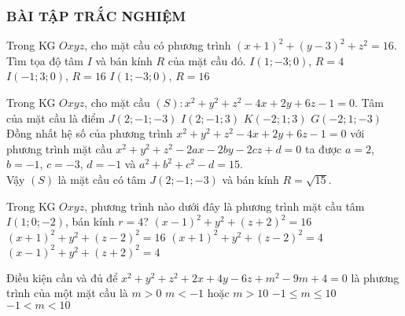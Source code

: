 \subsubsection{BÀI TẬP TRẮC NGHIỆM}
\begin{ex}%
	Trong KG $Oxyz$, cho mặt cầu có phương trình $(x+1)^2+(y-3)^2+z^2=16$. Tìm tọa độ tâm $I$ và bán kính $R$ của mặt cầu đó.
	{$I(1;-3;0)$, $R=4$}
	{$I(-1;3;0)$, $R=16$}
	{$I(1;-3;0)$, $R=16$}
\end{ex}
\begin{ex}%
	Trong KG $Oxyz$, cho mặt cầu $(S)\colon x^2+y^2+z^2 -4x+2y+6z-1=0$. Tâm của mặt cầu là điểm
	\choice
	{\True $J(2;-1;-3)$}
	{$I(2;-1;3)$}
	{$K(-2;1;3)$}
	{$G(-2;1;-3)$}
	\loigiai
	{
		Đồng nhất hệ số của phương trình $x^2+y^2+z^2 -4x+2y+6z-1=0$ với phương trình mặt cầu $x^2+y^2+z^2 -2ax-2by-2cz+d=0$ ta được $a=2$, $b=-1$, $c=-3$, $d=-1$ và $a^2+b^2+c^2-d=15$.\\
		Vậy $(S)$ là mặt cầu có tâm $J(2;-1;-3)$ và bán kính $R=\sqrt{15}$.
	}
\end{ex}
\begin{ex}%
	Trong KG $Oxyz$, phương trình nào dưới đây là phương trình mặt cầu tâm	$I(1;0;-2)$, bán kính $r=4$?
	\choice
	{\True $(x-1)^2 +y^2 + (z+2)^2 =16$}
	{$(x+1)^2 +y^2 + (z-2)^2 =16$}
	{$(x+1)^2 +y^2 + (z-2)^2 =4$}
	{$(x-1)^2 +y^2 + (z+2)^2 =4$}
\end{ex}
\begin{ex}%
	Điều kiện cần và đủ để $x^2+y^2+z^2+2x+4y-6z+m^2-9m+4=0$ là phương trình của một mặt cầu là
	\choice
	{$m>0$}
	{$m<-1$ hoặc $m>10$}
	{ $-1 \le m \le 10$}
	{\True $-1<m<10$}
\end{ex}

